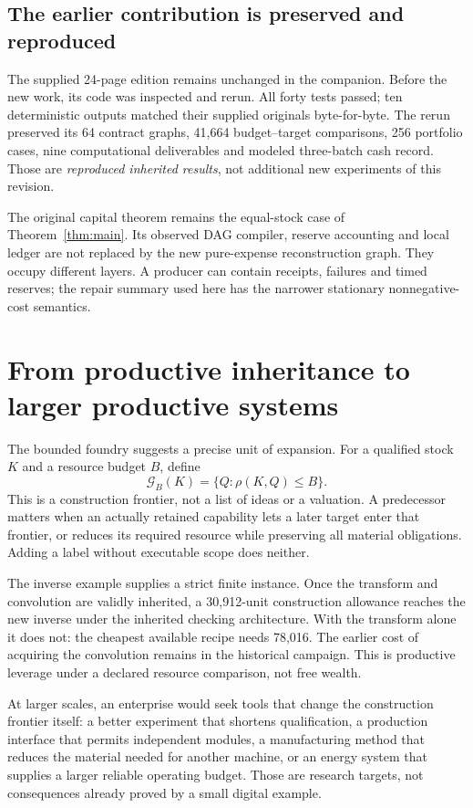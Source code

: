\documentclass[11pt,letterpaper]{article}
\theoremstyle{definition}\newtheorem{definition}[theorem]{Definition}
\theoremstyle{remark}\newtheorem{remark}[theorem]{Remark}
\begin{document}
\subsection{The earlier contribution is preserved and reproduced}
The supplied 24-page edition remains unchanged in the companion. Before the new work, its code was inspected and rerun. All forty tests passed; ten deterministic outputs matched their supplied originals byte-for-byte. The rerun preserved its 64 contract graphs, 41,664 budget--target comparisons, 256 portfolio cases, nine computational deliverables and modeled three-batch cash record. Those are \emph{reproduced inherited results}, not additional new experiments of this revision.

The original capital theorem remains the equal-stock case of Theorem~\ref{thm:main}. Its observed DAG compiler, reserve accounting and local ledger are not replaced by the new pure-expense reconstruction graph. They occupy different layers. A producer can contain receipts, failures and timed reserves; the repair summary used here has the narrower stationary nonnegative-cost semantics.

\section{From productive inheritance to larger productive systems}
\label{sec:scale}
The bounded foundry suggests a precise unit of expansion. For a qualified stock $K$ and a resource budget $B$, define
\begin{equation}
 \mathcal G_B(K)=\{Q:\rho(K,Q)\le B\}.
 \label{eq:frontier}
\end{equation}
This is a construction frontier, not a list of ideas or a valuation. A predecessor matters when an actually retained capability lets a later target enter that frontier, or reduces its required resource while preserving all material obligations. Adding a label without executable scope does neither.

The inverse example supplies a strict finite instance. Once the transform and convolution are validly inherited, a 30,912-unit construction allowance reaches the new inverse under the inherited checking architecture. With the transform alone it does not: the cheapest available recipe needs 78,016. The earlier cost of acquiring the convolution remains in the historical campaign. This is productive leverage under a declared resource comparison, not free wealth.

At larger scales, an enterprise would seek tools that change the construction frontier itself: a better experiment that shortens qualification, a production interface that permits independent modules, a manufacturing method that reduces the material needed for another machine, or an energy system that supplies a larger reliable operating budget. Those are research targets, not consequences already proved by a small digital example.
\end{document}
